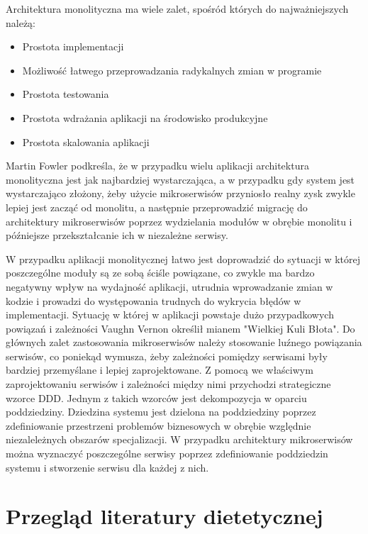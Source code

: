 \par
Architektura monolityczna ma wiele zalet\cite{book:microservices-patterns}, spośród których do najważniejszych należą:
\begin{itemize}
    \item Prostota implementacji
    \item Możliwość łatwego przeprowadzania radykalnych zmian w programie
    \item Prostota testowania
    \item Prostota wdrażania aplikacji na środowisko produkcyjne
    \item Prostota skalowania aplikacji
\end{itemize}

\par
Martin Fowler podkreśla, że w przypadku wielu aplikacji architektura monolityczna jest jak najbardziej wystarczająca,
a w przypadku gdy system jest wystarczająco złożony, żeby użycie mikroserwisów przyniosło realny zysk zwykle lepiej jest zacząć od monolitu,
a następnie przeprowadzić migrację do architektury mikroserwisów poprzez wydzielania modułów w obrębie monolitu i późniejsze przekształcanie ich w niezależne serwisy\cite{url:monolith-first}.

\par
W przypadku aplikacji monolitycznej łatwo jest doprowadzić do sytuacji w której poszczególne moduły są ze sobą ściśle powiązane, co zwykle ma bardzo negatywny wpływ na wydajność aplikacji, utrudnia wprowadzanie zmian w kodzie i prowadzi do występowania trudnych do wykrycia błędów w implementacji.
Sytuację w której w aplikacji powstaje dużo przypadkowych powiązań i zależności Vaughn Vernon określił mianem "Wielkiej Kuli Błota"\cite{book:ddd-kompendium}.
Do głównych zalet zastosowania mikroserwisów należy stosowanie luźnego powiązania serwisów, co poniekąd wymusza, żeby zależności pomiędzy serwisami były bardziej przemyślane i lepiej zaprojektowane.
Z pomocą we właściwym zaprojektowaniu serwisów i zależności między nimi przychodzi strategiczne wzorce DDD.
Jednym z takich wzorców jest dekompozycja w oparciu poddziedziny\cite{ddd-evans}.
Dziedzina systemu jest dzielona na poddziedziny poprzez zdefiniowanie przestrzeni problemów biznesowych w obrębie względnie niezaleleżnych obszarów specjalizacji.
W przypadku architektury mikroserwisów można wyznaczyć poszczególne serwisy poprzez zdefiniowanie poddziedzin systemu i stworzenie serwisu dla każdej z nich\cite{book:microservices-patterns}.

\section{Przegląd literatury dietetycznej}\label{sec:domain-literature}

\thispagestyle{normal}
